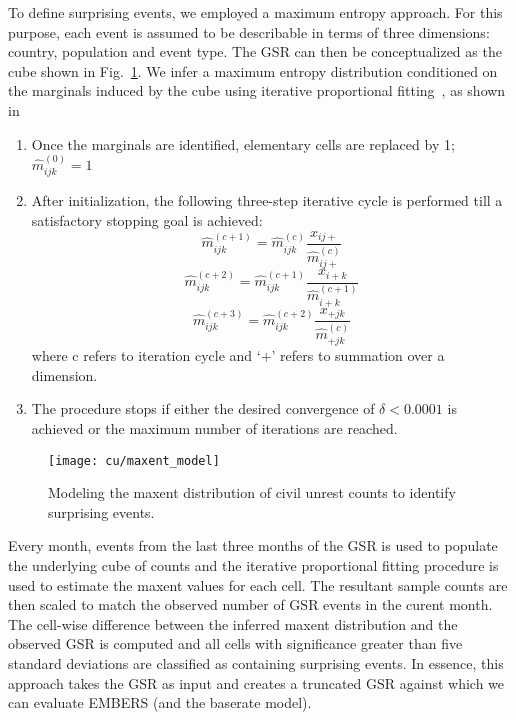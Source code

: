 To define surprising events, 
we employed a maximum entropy approach. For this purpose, each event is assumed
to be describable
in terms of three dimensions: country, population and event type. The GSR can then be conceptualized
as the cube shown in Fig.~\ref{fig:maxent_model}. We infer a maximum entropy distribution conditioned on the marginals
induced by the cube using iterative proportional fitting~\cite{bishop2007discrete}, as shown in 

\begin{enumerate}
\item Once the marginals are identified, elementary cells are replaced by 1; $\widehat{m}^{(0)}_{ijk}=1$
\item After initialization, the following three-step iterative cycle is performed till a satisfactory stopping goal is achieved:
$$\widehat{m}^{(c+1)}_{ijk} = \widehat{m}^{(c)}_{ijk}\frac{x_{ij+}}{\widehat{m}^{(c)}_{ij+}}$$
$$\widehat{m}^{(c+2)}_{ijk} = \widehat{m}^{(c+1)}_{ijk}\frac{x_{i+k}}{\widehat{m}^{(c+1)}_{i+k}}$$
$$\widehat{m}^{(c+3)}_{ijk} = \widehat{m}^{(c+2)}_{ijk}\frac{x_{+jk}}{\widehat{m}^{(c)}_{+jk}}$$
where c refers to iteration cycle and `+' refers to summation over a dimension. 
\item The procedure stops if either the desired convergence of $\delta < 0.0001$ is achieved or the maximum number of iterations are reached.
\end{enumerate}


\begin{figure}[H]
\centering
\texttt{[image: cu/maxent\_model]}
\caption{Modeling the maxent distribution of civil unrest counts to identify surprising events.}
\label{fig:maxent_model}
\end{figure}

Every month, events from the last three months of the
GSR is used to populate the underlying cube of counts and the iterative proportional fitting procedure is
used to estimate the maxent values for each cell. The resultant sample counts are then scaled to
match the observed number of GSR events in the curent month. The cell-wise difference between the inferred
maxent distribution and the observed GSR is computed and all cells with significance greater than five standard
deviations are classified as containing surprising events. In essence, this approach takes the GSR as input and
creates a truncated GSR against which we can evaluate EMBERS (and the baserate model).

